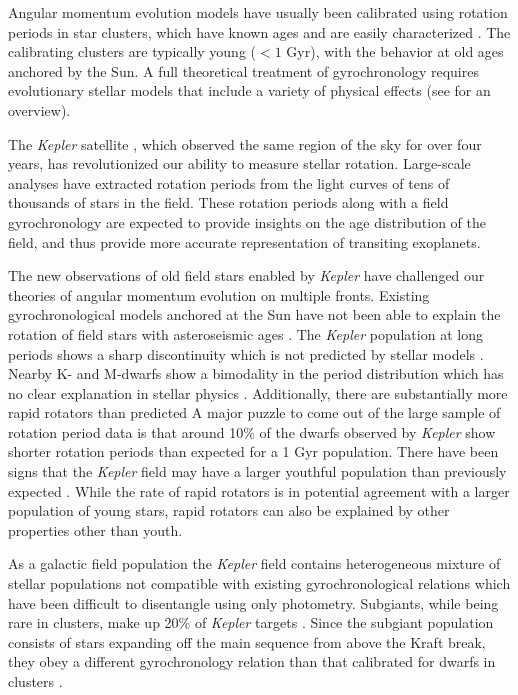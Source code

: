 \documentclass[manuscript]{aastex6}
\newcommand{\Kepler}{\mbox{\textit{Kepler}}}
\begin{document}
Angular momentum evolution models have usually been calibrated using rotation periods in
star clusters, which have known ages and are easily characterized
\citep{Krishnamurthi97, Gallet13, Somers17}. The calibrating clusters are typically
young (\(< 1\) Gyr), with the behavior at old ages anchored by the Sun. A full 
theoretical treatment of gyrochronology requires evolutionary stellar models 
that include a variety of physical effects (see \citet{Gallet13} for an
overview).

The \Kepler{} satellite \citep{Borucki10,Koch10}, which observed the same
region of the sky for over four years, has revolutionized our ability to
measure stellar rotation. Large-scale analyses have extracted rotation periods
from the light curves of tens of thousands of stars \citep{Nielsen13,
Reinhold13, Garcia14, McQuillan14} in the field. These rotation periods along 
with a field gyrochronology are expected to provide insights on the age 
distribution of the field, and thus provide more accurate representation of 
transiting exoplanets.

The new observations of old field stars enabled by \Kepler{} have challenged 
our theories of angular momentum evolution on multiple fronts. Existing 
gyrochronological models anchored at the Sun have not been able to explain
the rotation of field stars with asteroseismic ages \citep{Angus15, 
VanSaders16}. The \Kepler{} population at long periods shows a sharp
discontinuity which is not predicted by stellar models \citep{VanSaders18}. 
Nearby K- and M-dwarfs show a bimodality in the period distribution which has
no clear explanation in stellar physics \citep{Davenport18}. Additionally,
there are substantially more rapid rotators than predicted
A major puzzle to come out of the large sample of rotation period data is that
around 10\% of the dwarfs observed by \Kepler{} show shorter rotation periods 
than expected for a 1 Gyr population. There have been signs that the
\Kepler{} field may have a larger youthful population than previously expected
\citep{Berger18a}. While the rate of rapid rotators is in potential agreement
with a larger population of young stars, rapid rotators can also be explained
by other properties other than youth.


As a galactic field population the \Kepler{} field contains heterogeneous
mixture of stellar populations not compatible with existing gyrochronological
relations which have been difficult to disentangle using only photometry.
Subgiants, while being rare in clusters, make up 20\% of \Kepler{} targets
\citep{Gaidos13, Berger18b}. Since the subgiant population consists of stars
expanding off the main sequence from above the Kraft break, they obey a
different gyrochronology relation than that calibrated for dwarfs in clusters
\citep{vanSaders13}. 
\end{document}
